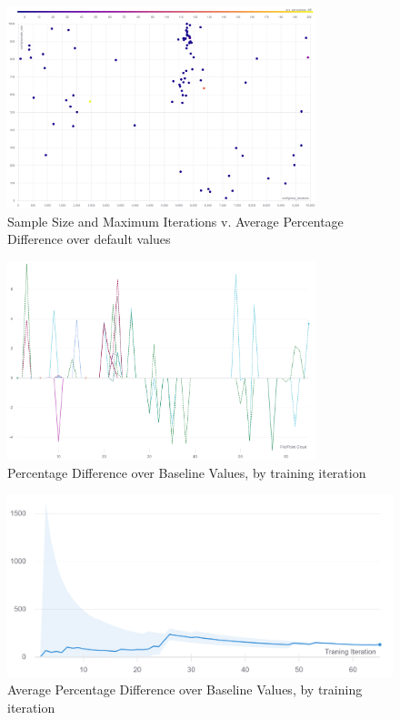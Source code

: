 	\begin{figure}[h]
	\centering
	\includegraphics[width=0.8\textwidth, keepaspectratio]{images/ss_mi_ad.png}
	\caption{Sample Size and Maximum Iterations v. Average Percentage Difference over default values}
	\label{fig:eval1}
	\end{figure}

	\begin{figure}[H]
	\centering
	\includegraphics[width=0.8\textwidth, keepaspectratio]{images/timeline.png}
	\caption{Percentage Difference over Baseline Values, by training iteration}
	\label{fig:eval3}
	\end{figure}

	\begin{figure}[H]
	\centering
	\includegraphics[width=\textwidth, keepaspectratio]{images/average_timeline.png}
	\caption{Average Percentage Difference over Baseline Values, by training iteration}
	\label{fig:eval4}
	\end{figure}

